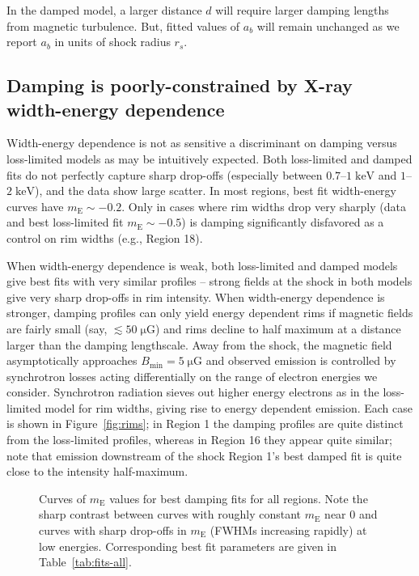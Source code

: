 \documentclass[manuscript]{aastex}  %
\newcommand*{\mt}{\mathrm}
\newcommand*{\unit}[1]{\;\mt{#1}}  %
\newcommand*{\mE}{m_\mt{E}}
\newcommand*{\muG}{\unit{\mu G}}
\begin{document}
In the damped model, a larger distance $d$ will require larger damping lengths
from magnetic turbulence.  But, fitted values of $a_b$ will remain unchanged as
we report $a_b$ in units of shock radius $r_s$.

\subsection{Damping is poorly-constrained by X-ray width-energy dependence}
\label{sec:damp-fit-disc}

Width-energy dependence is not as sensitive a discriminant on damping versus
loss-limited models as may be intuitively expected.  Both loss-limited and
damped fits do not perfectly capture sharp drop-offs (especially between
$0.7$--$1 \unit{keV}$ and $1$--$2 \unit{keV}$), and the data show large
scatter.  In most regions, best fit width-energy curves have $\mE \sim -0.2$.
Only in cases where rim widths drop very sharply (data and best loss-limited
fit $\mE \sim -0.5$) is damping significantly disfavored as a control on rim
widths (e.g., Region 18).

When width-energy dependence is weak, both loss-limited and damped models give
best fits with very similar profiles -- strong fields at the shock in both models
give very sharp drop-offs in rim intensity.  When width-energy dependence is
stronger, damping profiles can only yield energy dependent rims if magnetic
fields are fairly small (say, $\lesssim 50 \muG$) and rims decline to half
maximum at a distance larger than the damping lengthscale.  Away from the
shock, the magnetic field asymptotically approaches $B_{\mt{min}} = 5 \muG$ and
observed emission is controlled by synchrotron losses acting differentially on
the range of electron energies we consider.  Synchrotron radiation sieves out
higher energy electrons as in the loss-limited model for rim widths, giving
rise to energy dependent emission.  Each case is shown in
Figure~\ref{fig:rims}; in Region 1 the damping profiles are quite distinct from
the loss-limited profiles, whereas in Region 16 they appear quite similar; note
that emission downstream of the shock Region 1's best damped fit is quite close
to the intensity half-maximum.

\begin{figure}
    \centering
    \iftoggle{manuscript}{
        \texttt{[image: figures/mE-damp.pdf]}
    }{
        \plotone{figures/mE-damp.pdf}
    }
    \caption{Curves of $\mE$ values for best damping fits for all regions.
        Note the sharp contrast between curves with roughly constant $\mE$ near
        $0$ and curves with sharp drop-offs in $\mE$ (FWHMs increasing rapidly)
        at low energies. Corresponding best fit parameters are given in
        Table~\ref{tab:fits-all}. \label{fig:mE}}
\end{figure}
\end{document}

